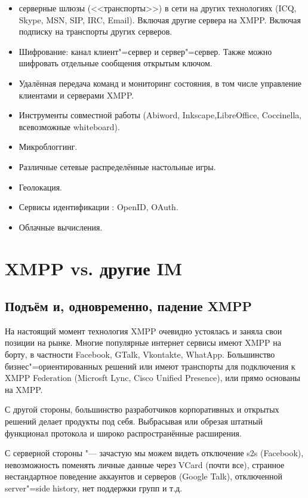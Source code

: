 \documentclass[10pt, a5paper]{article}
\begin{document}
\begin{itemize}
  \item серверные шлюзы (<<транспорты>>) в сети на других технологиях (ICQ, Skype, MSN, SIP, IRC, Email). Включая другие сервера на XMPP. Включая подписку на транспорты других серверов.
  \item Шифрование: канал клиент"=сервер и сервер"=сервер. Также \linebreak можно шифровать отдельные сообщения открытым ключом.
  \item Удалённая передача команд и мониторинг состояния, в том числе управление клиентами и серверами XMPP.
  \item Инструменты совместной работы (Abiword, Inkscape,\linebreak LibreOffice, Coccinella, всевозможные whiteboard).
  \item Микроблоггинг.
  \item Различные сетевые распределённые настольные игры.
  \item Геолокация.
  \item Сервисы идентификации : OpenID, OAuth.
  \item Облачные вычисления.
\end{itemize}

\section*{XMPP vs. другие IM}

\subsection*{Подъём и, одновременно, падение XMPP}

На настоящий момент технология  XMPP очевидно устоялась и заняла свои позиции на рынке. Многие популярные интернет сервисы имеют XMPP на борту, в частности Facebook, GTalk, Vkontakte, WhatApp. Большинство бизнес"=ориентированных решений или имеют транспорты для подключения к XMPP Federation (Microsft Lync, Cisco Unified Presence), или прямо основаны на XMPP.

С другой стороны, большинство разработчиков корпоративных и открытых решений делает продукты под себя.  Выбрасывая или обрезая штатный функционал протокола и широко распространённые расширения.

С серверной стороны "--- зачастую мы можем видеть отключение s2s (Facebook), невозможность поменять личные данные через VCard (почти все), странное нестандартное поведение аккаунтов и серверов (Google Talk), отключенной server"=side history, нет поддержки групп  и т.д.
\end{document}
